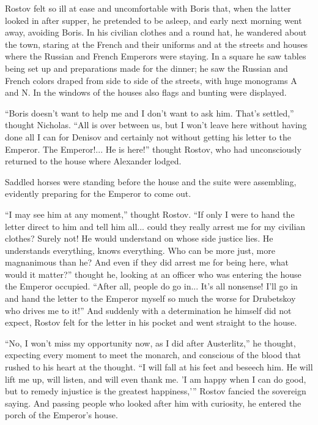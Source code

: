 Rostov felt so ill at ease and uncomfortable with Boris that,
when the latter looked in after supper, he pretended to be
asleep, and early next morning went away, avoiding Boris. In his
civilian clothes and a round hat, he wandered about the town,
staring at the French and their uniforms and at the streets and
houses where the Russian and French Emperors were staying. In a
square he saw tables being set up and preparations made for the
dinner; he saw the Russian and French colors draped from side to
side of the streets, with huge monograms A and N. In the windows
of the houses also flags and bunting were displayed.

``Boris doesn't want to help me and I don't want to ask
him. That's settled,'' thought Nicholas. ``All is over between
us, but I won't leave here without having done all I can for
Denisov and certainly not without getting his letter to the
Emperor. The Emperor!... He is here!'' thought Rostov, who had
unconsciously returned to the house where Alexander lodged.

Saddled horses were standing before the house and the suite were
assembling, evidently preparing for the Emperor to come out.

``I may see him at any moment,'' thought Rostov. ``If only I were
to hand the letter direct to him and tell him all... could they
really arrest me for my civilian clothes? Surely not! He would
understand on whose side justice lies. He understands everything,
knows everything. Who can be more just, more magnanimous than he?
And even if they did arrest me for being here, what would it
matter?'' thought he, looking at an officer who was entering the
house the Emperor occupied. ``After all, people do go in... It's
all nonsense! I'll go in and hand the letter to the Emperor
myself so much the worse for Drubetskoy who drives me to it!''
And suddenly with a determination he himself did not expect,
Rostov felt for the letter in his pocket and went straight to the
house.

``No, I won't miss my opportunity now, as I did after
Austerlitz,'' he thought, expecting every moment to meet the
monarch, and conscious of the blood that rushed to his heart at
the thought. ``I will fall at his feet and beseech him. He will
lift me up, will listen, and will even thank me. 'I am happy when
I can do good, but to remedy injustice is the greatest
happiness,'{}'' Rostov fancied the sovereign saying. And passing
people who looked after him with curiosity, he entered the porch
of the Emperor's house.

